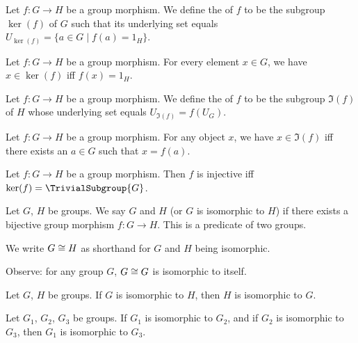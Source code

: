 \begin{definition}
Let $f\colon G\to H$ be a group morphism.
We define the  of $f$ to be the subgroup $\ker(f)$ of
$G$ such that its underlying set equals $U_{\ker(f)}=\{a\in G\mid f(a)=1_{H}\}$.
\end{definition}

\begin{theorem}
Let $f\colon G\to H$ be a group morphism.
For every element $x\in G$, we have $x\in\ker(f)$ iff $f(x)=1_{H}$.
\end{theorem}

\begin{definition}
Let $f\colon G\to H$ be a group morphism.
We define the  of $f$ to be the subgroup $\Im(f)$ of $H$
whose underlying set equals $U_{\Im(f)}=f(U_{G})$.
\end{definition}

\begin{theorem}
Let $f\colon G\to H$ be a group morphism.
For any object $x$, we have $x\in\Im(f)$ iff there exists an $a\in G$
such that $x=f(a)$.
\end{theorem}

\begin{theorem}
Let $f\colon G\to H$ be a group morphism.
Then $f$ is injective iff $\ker(f)=\TrivialSubgroup{G}$.
\end{theorem}

\begin{definition}
Let $G$, $H$ be groups.
We say $G$ and $H$  (or $G$ is isomorphic to $H$)
if there exists a bijective group morphism $f\colon G\to H$.
This is a predicate of two groups.

We write $G\cong H$ as shorthand for $G$ and $H$ being isomorphic.

Observe: for any group $G$, $G\cong G$ is isomorphic to itself.
\end{definition}

\begin{theorem}
Let $G$, $H$ be groups.
If $G$ is isomorphic to $H$, then $H$ is isomorphic to $G$.
\end{theorem}

\begin{theorem}
Let $G_{1}$, $G_{2}$, $G_{3}$ be groups.
If $G_{1}$ is isomorphic to $G_{2}$, and if $G_{2}$ is isomorphic to $G_{3}$,
then $G_{1}$ is isomorphic to $G_{3}$.
\end{theorem}

